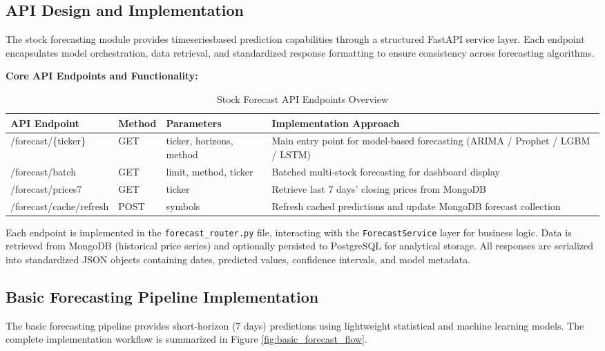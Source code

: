\subsection{API Design and Implementation}

The stock forecasting module provides time\–series\–based prediction capabilities through a structured FastAPI service layer. Each endpoint encapsulates model orchestration, data retrieval, and standardized response formatting to ensure consistency across forecasting algorithms.

\textbf{Core API Endpoints and Functionality:}

\begin{table}[h]
\centering
\caption{Stock Forecast API Endpoints Overview}
\begin{tabular}{|p{4cm}|p{2.5cm}|p{3cm}|p{4cm}|}
\hline
\textbf{API Endpoint} & \textbf{Method} & \textbf{Parameters} & \textbf{Implementation Approach} \\
\hline
/forecast/\{ticker\} & GET & ticker, horizons, method & Main entry point for model-based forecasting (ARIMA / Prophet / LGBM / LSTM) \\
\hline
/forecast/batch & GET & limit, method, ticker & Batched multi-stock forecasting for dashboard display \\
\hline
/forecast/prices7 & GET & ticker & Retrieve last 7 days’ closing prices from MongoDB \\
\hline
/forecast/cache/refresh & POST & symbols & Refresh cached predictions and update MongoDB forecast collection \\
\hline
\end{tabular}
\end{table}

Each endpoint is implemented in the \texttt{forecast\_router.py} file, interacting with the \texttt{ForecastService} layer for business logic. Data is retrieved from MongoDB (historical price series) and optionally persisted to PostgreSQL for analytical storage. All responses are serialized into standardized JSON objects containing dates, predicted values, confidence intervals, and model metadata.

\subsection{Basic Forecasting Pipeline Implementation}

The basic forecasting pipeline provides short-horizon (7 days) predictions using lightweight statistical and machine learning models. The complete implementation workflow is summarized in Figure \ref{fig:basic_forecast_flow}.

